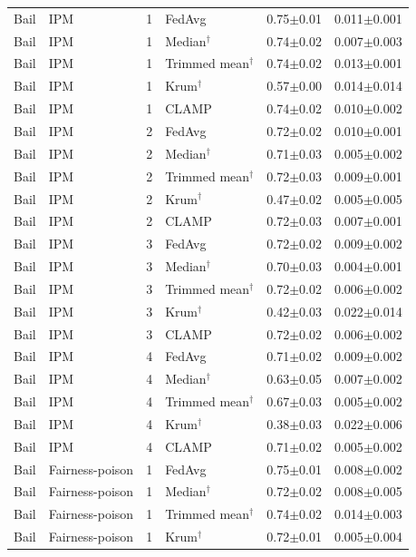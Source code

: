 \begin{longtable}{llclcc}
Bail & IPM & 1 & FedAvg & 0.75$\pm$0.01 & 0.011$\pm$0.001 \\
Bail & IPM & 1 & Median$^\dagger$ & 0.74$\pm$0.02 & 0.007$\pm$0.003 \\
Bail & IPM & 1 & Trimmed mean$^\dagger$ & 0.74$\pm$0.02 & 0.013$\pm$0.001 \\
Bail & IPM & 1 & Krum$^\dagger$ & 0.57$\pm$0.00 & 0.014$\pm$0.014 \\
Bail & IPM & 1 & CLAMP & 0.74$\pm$0.02 & 0.010$\pm$0.002 \\
Bail & IPM & 2 & FedAvg & 0.72$\pm$0.02 & 0.010$\pm$0.001 \\
Bail & IPM & 2 & Median$^\dagger$ & 0.71$\pm$0.03 & 0.005$\pm$0.002 \\
Bail & IPM & 2 & Trimmed mean$^\dagger$ & 0.72$\pm$0.03 & 0.009$\pm$0.001 \\
Bail & IPM & 2 & Krum$^\dagger$ & 0.47$\pm$0.02 & 0.005$\pm$0.005 \\
Bail & IPM & 2 & CLAMP & 0.72$\pm$0.03 & 0.007$\pm$0.001 \\
Bail & IPM & 3 & FedAvg & 0.72$\pm$0.02 & 0.009$\pm$0.002 \\
Bail & IPM & 3 & Median$^\dagger$ & 0.70$\pm$0.03 & 0.004$\pm$0.001 \\
Bail & IPM & 3 & Trimmed mean$^\dagger$ & 0.72$\pm$0.02 & 0.006$\pm$0.002 \\
Bail & IPM & 3 & Krum$^\dagger$ & 0.42$\pm$0.03 & 0.022$\pm$0.014 \\
Bail & IPM & 3 & CLAMP & 0.72$\pm$0.02 & 0.006$\pm$0.002 \\
Bail & IPM & 4 & FedAvg & 0.71$\pm$0.02 & 0.009$\pm$0.002 \\
Bail & IPM & 4 & Median$^\dagger$ & 0.63$\pm$0.05 & 0.007$\pm$0.002 \\
Bail & IPM & 4 & Trimmed mean$^\dagger$ & 0.67$\pm$0.03 & 0.005$\pm$0.002 \\
Bail & IPM & 4 & Krum$^\dagger$ & 0.38$\pm$0.03 & 0.022$\pm$0.006 \\
Bail & IPM & 4 & CLAMP & 0.71$\pm$0.02 & 0.005$\pm$0.002 \\
Bail & Fairness-poison & 1 & FedAvg & 0.75$\pm$0.01 & 0.008$\pm$0.002 \\
Bail & Fairness-poison & 1 & Median$^\dagger$ & 0.72$\pm$0.02 & 0.008$\pm$0.005 \\
Bail & Fairness-poison & 1 & Trimmed mean$^\dagger$ & 0.74$\pm$0.02 & 0.014$\pm$0.003 \\
Bail & Fairness-poison & 1 & Krum$^\dagger$ & 0.72$\pm$0.01 & 0.005$\pm$0.004 \\

\end{longtable}

